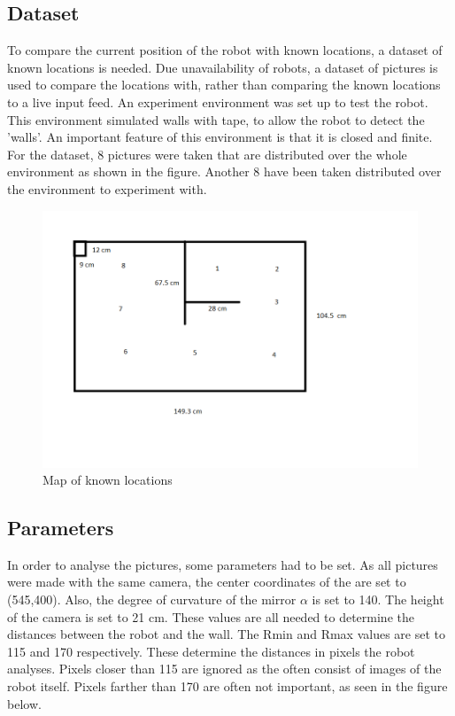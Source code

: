 \documentclass[12pt]{article}
\begin{document}
\subsection{Dataset}
To compare the current position of the robot with known locations, a dataset of known locations is needed. Due unavailability of robots, a dataset of pictures is used to compare the locations with, rather than comparing the known locations to a live input feed.
An experiment environment was set up to test the robot. This environment simulated walls with tape, to allow the robot to detect the 'walls'. An important feature of this environment is that it is closed and finite.
For the dataset, 8 pictures were taken that are distributed over the whole environment as shown in the figure. Another 8 have been taken distributed over the environment to experiment with.

\begin{figure}[H]
	\centering
	\includegraphics[width=\textwidth]{Opzet.png}
	\caption{Map of known locations}
\end{figure}

\subsection{Parameters}
In order to analyse the pictures, some parameters had to be set. As all pictures were made with the same camera, the center coordinates of the are set to (545,400). Also, the degree of curvature of the mirror $\alpha$ is set to 140. The height of the camera is set to 21 cm. These values are all needed to determine the distances between the robot and the wall. The Rmin and Rmax values are set to 115 and 170 respectively. These determine the distances in pixels the robot analyses. Pixels closer than 115 are ignored as the often consist of images of the robot itself. Pixels farther than 170 are often not important, as seen in the figure below.
\end{document}
